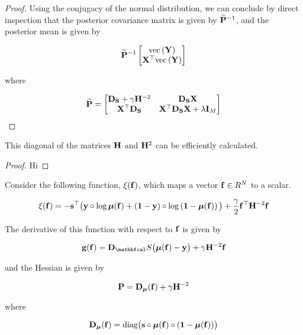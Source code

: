 \begin{proof}
    Using the conjugacy of the normal distribution, we can conclude by direct inspection that the posterior covariance matrix is given by $\widetilde{\mathbf{P}}^{-1}$, and the posterior mean is given by 

    $$
    \widetilde{\mathbf{P}}^{-1} \begin{bmatrix} \text{\textup{vec}}\left(\mathbf{Y}\right) \\ \mathbf{X}^\top \text{\textup{vec}}\left(\mathbf{Y}\right) \end{bmatrix}
    $$

    where 

    $$
    \widetilde{\mathbf{P}} = \begin{bmatrix}
        \mathbf{D}_{\mathbf{S}} + \gamma \mathbf{H}^{-2} & \mathbf{D}_{\mathbf{S}}  \mathbf{X} \\
        \mathbf{X}^\top \mathbf{D}_{\mathbf{S}} & \mathbf{X}^\top \mathbf{D}_{\mathbf{S}} \mathbf{X} + \lambda \mathbf{I}_M   
       \end{bmatrix}
    $$

\end{proof}


\begin{theorem}
    \label{the:efficient_H_diag}

    This diagonal of the matrices $\mathbf{H}$ and $\mathbf{H}^2$ can be efficiently calculated. 
\end{theorem}

\begin{proof}
    Hi 
\end{proof}


\begin{theorem}
    \label{the:gradient_and_hesian}

    Consider the following function, $\xi(\mathbf{f})$, which maps a vector $\mathbf{f} \in R^N$ to a scalar. 

    \begin{equation}
        \xi(\mathbf{f}) = -\mathbf{s}^\top \big(\mathbf{y} \circ \log \boldsymbol{\mu}(\mathbf{f}) + \left(\mathbf{1}  - \mathbf{y}\right) \circ \log \left(\mathbf{1} - \boldsymbol{\mu}(\mathbf{f}) \right)\big) + \frac{\gamma}{2} \mathbf{f}^\top \mathbf{H}^{-2} \mathbf{f}
    \end{equation}

    The derivative of this function with respect to $\mathbf{f}$ is given by 

    \begin{equation}
        \g(\f) = \D_\St \big(\muu(\f) - \y\big) + \gamma \HH^{-2} \f
    \end{equation}

    and the Hessian is given by 

    \begin{equation}
        \mathbf{P}  =  \mathbf{D}_{\boldsymbol{\mu}}(\mathbf{f}) + \gamma \mathbf{H}^{-2}
    \end{equation}

    where 

    \begin{equation*}
        \mathbf{D}_{\boldsymbol{\mu}}(\mathbf{f}) = \textup{diag}\big(\mathbf{s} \circ \boldsymbol{\mu}(\mathbf{f}) \circ (\mathbf{1} - \boldsymbol{\mu}(\mathbf{f}))\big)
    \end{equation*}

\end{theorem}

